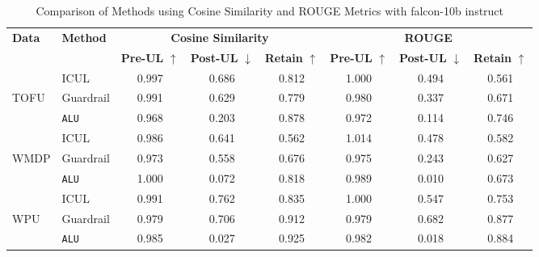 \begin{table*}[]
    \centering
    \caption{Comparison of Methods using Cosine Similarity and ROUGE Metrics with falcon-10b instruct}
    \begin{tabular}{llccc|ccc}
        \toprule
        \textbf{Data}&\textbf{Method} & \multicolumn{3}{c}{\textbf{Cosine Similarity}} & \multicolumn{3}{c}{\textbf{ROUGE}} \\
        \cmidrule(lr){3-5} \cmidrule(lr){6-8}
         & & \textbf{Pre-UL} $\uparrow$ & \textbf{Post-UL} $\downarrow$ & \textbf{Retain} $\uparrow$ & \textbf{Pre-UL} $\uparrow$ & \textbf{Post-UL} $\downarrow$ & \textbf{Retain} $\uparrow$ \\
        \midrule
        &ICUL & 0.997 & 0.686 & 0.812 & 1.000 & 0.494 & 0.561 \\
        TOFU &Guardrail & 0.991 & 0.629 & 0.779 & 0.980 & 0.337 & 0.671 \\
        &\texttt{ALU}  & 0.968 & 0.203 & 0.878 & 0.972 & 0.114 & 0.746 \\
        \midrule
        &ICUL  & 0.986 & 0.641 & 0.562 & 1.014 & 0.478 & 0.582 \\
        WMDP & Guardrail  & 0.973 & 0.558 & 0.676 & 0.975 & 0.243 & 0.627 \\
        &\texttt{ALU} & 1.000 & 0.072 & 0.818 & 0.989 & 0.010 & 0.673 \\
        \midrule
        &ICUL  & 0.991 & 0.762 & 0.835 & 1.000 & 0.547 & 0.753 \\
        WPU &Guardrail & 0.979 & 0.706 & 0.912 & 0.979 & 0.682 & 0.877 \\
        &\texttt{ALU} & 0.985 & 0.027 & 0.925 & 0.982 & 0.018 & 0.884 \\
        
        \bottomrule
    \end{tabular}
\label{tab:t24}    
\end{table*}

